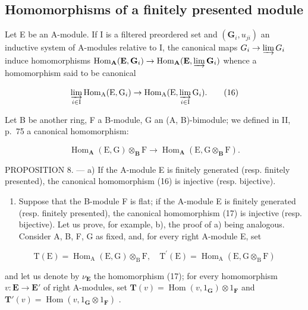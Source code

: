 \subsection{Homomorphisms of a finitely presented module}

Let E be an A-module. If I is a filtered preordered set and \((\mathbf{G}_{i}, u_{ji})\) an inductive system of A-modules relative to I, the canonical maps \(G_{i} \to \varinjlim G_{i}\) induce homomorphisms \(\operatorname{Hom}_{\mathbf{A}}(\mathbf{E}, \mathbf{G}_{i}) \to \operatorname{Hom}_{\mathbf{A}}(\mathbf{E}, \varinjlim \mathbf{G}_{i})\) whence a homomorphism said to be canonical

\[
\varinjlim_ {i \in \mathrm{I}} \operatorname{Hom} _ {\mathrm{A}} (\mathrm{E}, \mathrm{G} _ {i}) \rightarrow \operatorname{Hom} _ {\mathrm{A}} (\mathrm{E}, \varinjlim_ {i \in \mathrm{I}} \mathrm{G} _ {i}).\tag{16}
\]

Let B be another ring, F a B-module, G an (A, B)-bimodule; we defined in II, p.~75 a canonical homomorphism:

\[
\operatorname{Hom} _ {\mathbf {A}} (\mathrm{E}, \mathrm{G}) \otimes_ {\mathbf {B}} \mathrm{F} \rightarrow \operatorname{Hom} _ {\mathbf {A}} (\mathrm{E}, \mathrm{G} \otimes_ {\mathbf {B}} \mathrm{F}).\tag{17}
\]

PROPOSITION 8. --- a) If the A-module E is finitely generated (resp. finitely presented), the canonical homomorphism (16) is injective (resp. bijective).

\begin{enumerate}
\def\labelenumi{\alph{enumi})}
\setcounter{enumi}{1}
\tightlist
\item
  Suppose that the B-module F is flat; if the A-module E is finitely generated (resp. finitely presented), the canonical homomorphism (17) is injective (resp. bijective). Let us prove, for example, b), the proof of a) being analogous. Consider A, B, F, G as fixed, and, for every right A-module E, set
\end{enumerate}

\[
\mathrm{T} (\mathrm{E}) = \operatorname{Hom} _ {\mathrm{A}} (\mathrm{E}, \mathrm{G}) \otimes_ {\mathrm{B}} \mathrm{F}, \quad \mathrm{T} ^ {\prime} (\mathrm{E}) = \operatorname{Hom} _ {\mathrm{A}} (\mathrm{E}, \mathrm{G} \otimes_ {\mathrm{B}} \mathrm{F})
\]

and let us denote by \(\nu_{\mathbf{E}}\) the homomorphism (17); for every homomorphism \(v: \mathbf{E} \to \mathbf{E}'\) of right A-modules, set \(\mathbf{T}(v) = \operatorname{Hom}(v, 1_{\mathbf{G}}) \otimes 1_{\mathbf{F}}\) and \(\mathbf{T}'(v) = \operatorname{Hom}(v, 1_{\mathbf{G}} \otimes 1_{\mathbf{F}})\) .


